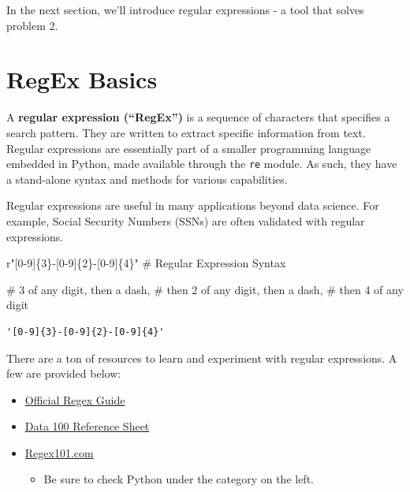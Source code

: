 \documentclass[
  letterpaper,
  DIV=11,
  numbers=noendperiod]{scrreprt}
\newenvironment{Shaded}{\begin{snugshade}}{\end{snugshade}}
\newcommand{\CommentTok}[1]{\textcolor[rgb]{0.37,0.37,0.37}{#1}}
\providecommand{\tightlist}{%
  \setlength{\itemsep}{0pt}\setlength{\parskip}{0pt}}\usepackage{longtable,booktabs,array}
\begin{document}
In the next section, we'll introduce regular expressions - a tool that
solves problem 2.

\section{RegEx Basics}\label{regex-basics}

A \textbf{regular expression (``RegEx'')} is a sequence of characters
that specifies a search pattern. They are written to extract specific
information from text. Regular expressions are essentially part of a
smaller programming language embedded in Python, made available through
the \texttt{re} module. As such, they have a stand-alone syntax and
methods for various capabilities.

Regular expressions are useful in many applications beyond data science.
For example, Social Security Numbers (SSNs) are often validated with
regular expressions.

\begin{Shaded}
\begin{Highlighting}[]
\CommentTok{r"[0{-}9]\{3\}{-}[0{-}9]\{2\}{-}[0{-}9]\{4\}"} \CommentTok{\# Regular Expression Syntax}

\CommentTok{\# 3 of any digit, then a dash,}
\CommentTok{\# then 2 of any digit, then a dash,}
\CommentTok{\# then 4 of any digit}
\end{Highlighting}
\end{Shaded}

\begin{verbatim}
'[0-9]{3}-[0-9]{2}-[0-9]{4}'
\end{verbatim}

There are a ton of resources to learn and experiment with regular
expressions. A few are provided below:

\begin{itemize}
\tightlist
\item
  \href{https://docs.python.org/3/howto/regex.html}{Official Regex
  Guide}
\item
  \href{https://ds100.org/sp22/resources/assets/hw/regex_reference.pdf}{Data
  100 Reference Sheet}
\item
  \href{https://regex101.com/}{Regex101.com}

  \begin{itemize}
  \tightlist
  \item
    Be sure to check Python under the category on the left.
  \end{itemize}
\end{itemize}
\end{document}
